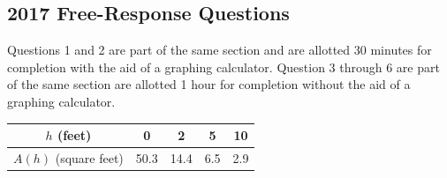 \subsection{2017 Free-Response Questions}
Questions 1 and 2 are part of the same section and are allotted 30 minutes for completion with the aid of a graphing calculator.
Question 3 through 6 are part of the same section are allotted 1 hour for completion without the aid of a graphing calculator.

\begin{table}[H]
	\begin{center}
		\begin{tabular}{|c||c|c|c|c|}
			\hline
			$h$ (feet) & 0 & 2 & 5 & 10 \\
			\hline
			$A(h)$ (square feet) & 50.3 & 14.4 & 6.5 & 2.9 \\
			\hline
		\end{tabular}
	\end{center}
\end{table}

